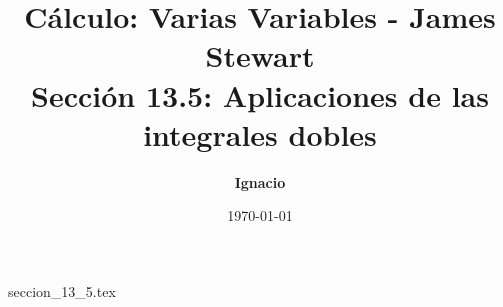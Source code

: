 \documentclass[11pt,spanish,oneside]{report}
\title{\textbf{Cálculo: Varias Variables - James Stewart} \\ \Large Sección 13.5: Aplicaciones de las integrales dobles}
\author{\textbf{Ignacio}}
\date{\today}
\begin{document}
\maketitle

{seccion_13_5.tex}
\end{document}
